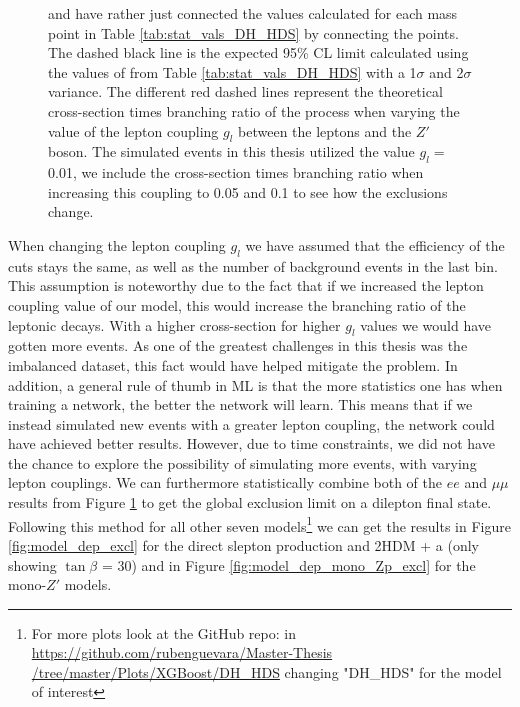 \documentclass[12pt, a4paper]{book}
\begin{document}
\begin{figure}[!ht]
{   and have rather just connected the values calculated for each mass point in Table \ref{tab:stat_vals_DH_HDS} by connecting the points. The dashed black line is the expected 95\% CL limit calculated using the values of from Table \ref{tab:stat_vals_DH_HDS} with a 1$\sigma$ and 2$\sigma$ variance. 
   The different red dashed lines represent the theoretical cross-section times branching ratio of the process when varying the value of the lepton coupling $g_l$ between the leptons and the $Z'$ boson. The simulated events in this thesis utilized the value $g_l=$ 0.01, we include the cross-section times branching ratio when increasing this coupling to 0.05 and 0.1 to see how the exclusions change.  }\label{fig:DH_HDS_exclusion_ee_uu}
\end{figure}
\noindent When changing the lepton coupling $g_l$ we have assumed that the efficiency of the cuts stays the same, as well as the number of background events in the last bin. This assumption is noteworthy due to the fact that if we increased the lepton coupling value of our model, this would increase the branching ratio 
of the leptonic decays. With a higher cross-section for higher $g_l$ values we would have gotten more events. As one of the greatest challenges in this thesis was the imbalanced dataset, this fact would have helped mitigate the problem. 
In addition, a general rule of thumb in ML is that the more statistics one has when training a network, the better the network will learn. 
This means that if we instead simulated new events with a greater lepton coupling, the network could have achieved better results. However, due to time constraints, we did not have the chance to explore the possibility of simulating more events, with varying lepton couplings.
\clearpage\noindent We can furthermore statistically combine both of the $ee$ and $\mu\mu$ results from Figure \ref{fig:DH_HDS_exclusion_ee_uu} to get the global exclusion limit on a dilepton final state. Following this method for all other seven models\footnote{For more plots look at the GitHub repo: in \href{https://github.com/rubenguevara/Master-Thesis/tree/master/Plots/XGBoost/DH_HDS}{https://github.com/rubenguevara/Master-Thesis\\/tree/master/Plots/XGBoost/DH\_HDS} changing "DH\_HDS" for the model of interest} 
we can get the results in Figure \ref{fig:model_dep_excl} for the direct slepton production and 2HDM + a (only showing $\tan\beta$ = 30) and in Figure \ref{fig:model_dep_mono_Zp_excl} for the mono-$Z'$ models.
\end{document}
